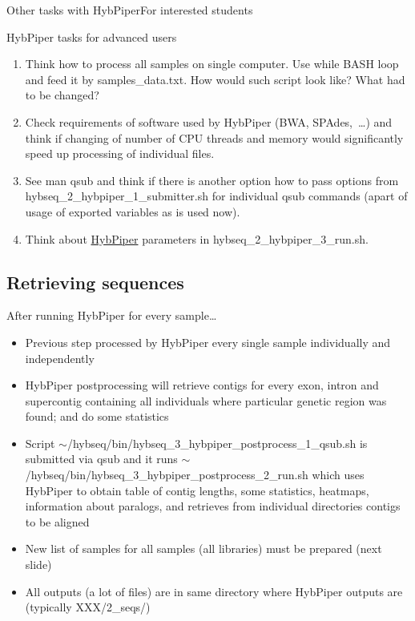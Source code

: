 \documentclass[compress,  xelatex, 11pt, xcolor=x11names, aspectratio=169,
	hyperref={
		bookmarks=true,
		unicode=true,
		colorlinks=true,
		pdftitle={HybSeq course},
		plainpages=false,
		pdfauthor={Vojtech Zeisek},
		pdfsubject={Practical processing of HybSeq target enrichment sequencing data on computing grids like MetaCentrum},
		pdfcreator={XeLaTeX},
		pdfkeywords={BASH, command line, GNU, HybSeq, Linux, MetaCentrum, sequencing shell, target enrichment},
		linkcolor=Turquoise4, %
		anchorcolor=DodgerBlue4, %
		citecolor=DodgerBlue4, %
		filecolor=DodgerBlue4, %
		menucolor=Tan4, %
		urlcolor=DarkOliveGreen4 %
		},
	url={hyphens, lowtilde} %
	]{beamer}
\renewcommand{\texttt}[1]{\colorbox{Cornsilk2}{{\ttfamily #1}}}
\begin{document}
\begin{frame}{Other tasks with HybPiper}{For interested students}
	\begin{exampleblock}{HybPiper tasks for advanced users}
		\begin{enumerate}
			\item Think how to process all samples on single computer. Use \texttt{while} BASH loop and feed it by \texttt{samples\_data.txt}. How would such script look like? What had to be changed?
			\item Check requirements of software used by HybPiper (BWA, SPAdes,~\ldots) and think if changing of number of CPU threads and memory would significantly speed up processing of individual files.
			\item See \texttt{man qsub} and think if there is another option how to pass options from \texttt{hybseq\_2\_hybpiper\_1\_submitter.sh} for individual \texttt{qsub} commands (apart of usage of exported variables as is used now).
			\item Think about \href{https://github.com/mossmatters/HybPiper/wiki}{HybPiper} parameters in \texttt{hybseq\_2\_hybpiper\_3\_run.sh}.
		\end{enumerate}
	\end{exampleblock}
\end{frame}

\subsection{Retrieving sequences}

\begin{frame}{After running HybPiper for every sample\ldots}
	\begin{itemize}
		\item Previous step processed by HybPiper every single sample individually and independently
		\item HybPiper postprocessing will retrieve contigs for every exon, intron and supercontig containing all individuals where particular genetic region was found; and do some statistics
		\item Script \texttt{$\sim$/hybseq/bin/hybseq\_3\_hybpiper\_postprocess\_1\_qsub.sh} is submitted via \texttt{qsub} and it runs \texttt{$\sim$/hybseq/bin/hybseq\_3\_hybpiper\_postprocess\_2\_run.sh} which uses HybPiper to obtain table of contig lengths, some statistics, heatmaps, information about paralogs, and retrieves from individual directories contigs to be aligned
		\item New list of samples for all samples (all libraries) must be prepared (next slide)
		\item All outputs (a lot of files) are in same directory where HybPiper outputs are (typically \texttt{XXX/2\_seqs/})
	\end{itemize}
\end{frame}
\end{document}
